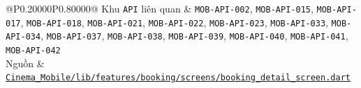 \begin{longtable}{@{}P{0.20000\SRSWidth}P{0.80000\SRSWidth}@{}}
Khu \texttt{API} liên quan & \texttt{MOB-\allowbreak{}API-\allowbreak{}002}, \texttt{MOB-\allowbreak{}API-\allowbreak{}015}, \texttt{MOB-\allowbreak{}API-\allowbreak{}017}, \texttt{MOB-\allowbreak{}API-\allowbreak{}018}, \texttt{MOB-\allowbreak{}API-\allowbreak{}021}, \texttt{MOB-\allowbreak{}API-\allowbreak{}022}, \texttt{MOB-\allowbreak{}API-\allowbreak{}023}, \texttt{MOB-\allowbreak{}API-\allowbreak{}033}, \texttt{MOB-\allowbreak{}API-\allowbreak{}034}, \texttt{MOB-\allowbreak{}API-\allowbreak{}037}, \texttt{MOB-\allowbreak{}API-\allowbreak{}038}, \texttt{MOB-\allowbreak{}API-\allowbreak{}039}, \texttt{MOB-\allowbreak{}API-\allowbreak{}040}, \texttt{MOB-\allowbreak{}API-\allowbreak{}041}, \texttt{MOB-\allowbreak{}API-\allowbreak{}042} \\[3pt]
Nguồn & \href{../../../Cinema\_Mobile/lib/features/booking/screens/booking\_detail\_screen.dart}{\texttt{Cinema\_\allowbreak{}Mobile/\allowbreak{}lib/\allowbreak{}features\allowbreak{}/\allowbreak{}booking/\allowbreak{}screens/\allowbreak{}booking\_\allowbreak{}detail\_\allowbreak{}screen.\allowbreak{}dart}} \\[3pt]
\end{longtable}
\endgroup

